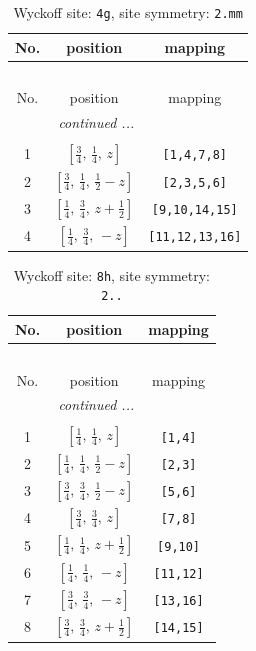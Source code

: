\documentclass[fleqn,8pt]{jsarticle}
\begin{document}
\renewcommand{\arraystretch}{1.2}
\begin{longtable}{ccc}
\caption{Wyckoff site: {\tt 4g}, site symmetry: {\tt 2.mm}}
 \\
 \hline \hline
No. & position & mapping \\ \hline \endfirsthead

\multicolumn{2}{l}{\tablename\ \thetable{}} \\
 \hline \hline
No. & position & mapping \\ \hline \endhead

 \hline \hline
\multicolumn{2}{r}{\footnotesize\it continued ...} \\ \endfoot

 \hline \hline
\multicolumn{2}{r}{} \\ \endlastfoot

1 & $\left[ \frac{3}{4},\, \frac{1}{4},\, z \right]$ & {\tt [1,4,7,8]} \\ \hline
2 & $\left[ \frac{3}{4},\, \frac{1}{4},\, \frac{1}{2} - z \right]$ & {\tt [2,3,5,6]} \\ \hline
3 & $\left[ \frac{1}{4},\, \frac{3}{4},\, z + \frac{1}{2} \right]$ & {\tt [9,10,14,15]} \\ \hline
4 & $\left[ \frac{1}{4},\, \frac{3}{4},\, - z \right]$ & {\tt [11,12,13,16]} \\
\end{longtable}
\renewcommand{\arraystretch}{1.2}
\begin{longtable}{ccc}
\caption{Wyckoff site: {\tt 8h}, site symmetry: {\tt 2..}}
 \\
 \hline \hline
No. & position & mapping \\ \hline \endfirsthead

\multicolumn{2}{l}{\tablename\ \thetable{}} \\
 \hline \hline
No. & position & mapping \\ \hline \endhead

 \hline \hline
\multicolumn{2}{r}{\footnotesize\it continued ...} \\ \endfoot

 \hline \hline
\multicolumn{2}{r}{} \\ \endlastfoot

1 & $\left[ \frac{1}{4},\, \frac{1}{4},\, z \right]$ & {\tt [1,4]} \\ \hline
2 & $\left[ \frac{1}{4},\, \frac{1}{4},\, \frac{1}{2} - z \right]$ & {\tt [2,3]} \\ \hline
3 & $\left[ \frac{3}{4},\, \frac{3}{4},\, \frac{1}{2} - z \right]$ & {\tt [5,6]} \\ \hline
4 & $\left[ \frac{3}{4},\, \frac{3}{4},\, z \right]$ & {\tt [7,8]} \\ \hline
5 & $\left[ \frac{1}{4},\, \frac{1}{4},\, z + \frac{1}{2} \right]$ & {\tt [9,10]} \\ \hline
6 & $\left[ \frac{1}{4},\, \frac{1}{4},\, - z \right]$ & {\tt [11,12]} \\ \hline
7 & $\left[ \frac{3}{4},\, \frac{3}{4},\, - z \right]$ & {\tt [13,16]} \\ \hline
8 & $\left[ \frac{3}{4},\, \frac{3}{4},\, z + \frac{1}{2} \right]$ & {\tt [14,15]} \\
\end{longtable}
\end{document}
